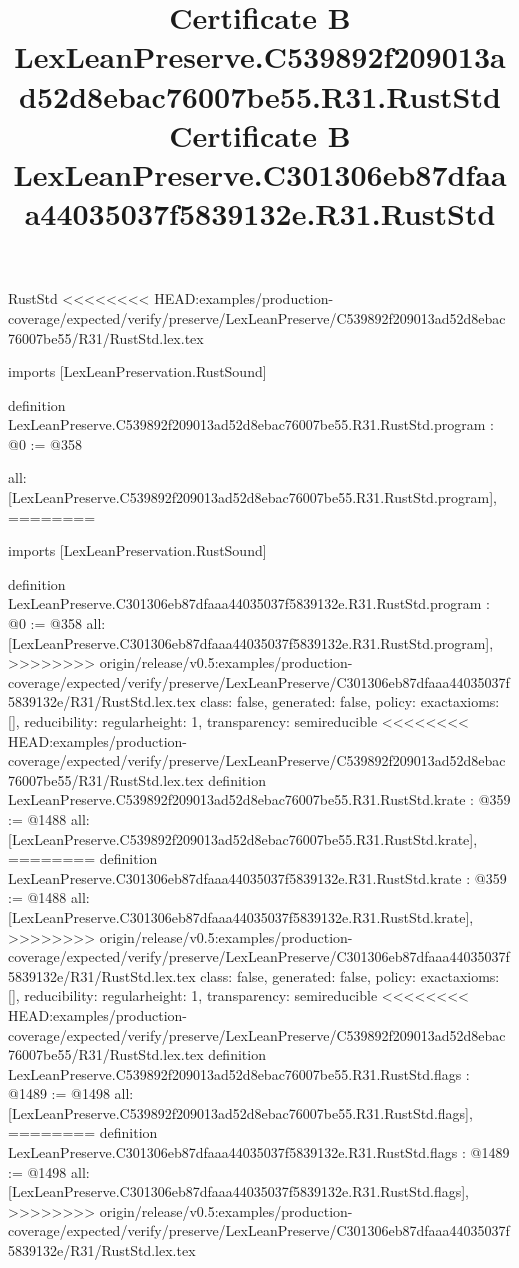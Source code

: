 \begin{lexlean}{RustStd}
<<<<<<<< HEAD:examples/production-coverage/expected/verify/preserve/LexLeanPreserve/C539892f209013ad52d8ebac76007be55/R31/RustStd.lex.tex
\title{Certificate B LexLeanPreserve.C539892f209013ad52d8ebac76007be55.R31.RustStd}
\begin{coremodule}
imports [LexLeanPreservation.RustSound]

definition LexLeanPreserve.C539892f209013ad52d8ebac76007be55.R31.RustStd.program : @0 := @358 {
  all: [LexLeanPreserve.C539892f209013ad52d8ebac76007be55.R31.RustStd.program],
========
\title{Certificate B LexLeanPreserve.C301306eb87dfaaa44035037f5839132e.R31.RustStd}
\begin{coremodule}
imports [LexLeanPreservation.RustSound]

definition LexLeanPreserve.C301306eb87dfaaa44035037f5839132e.R31.RustStd.program : @0 := @358 {
  all: [LexLeanPreserve.C301306eb87dfaaa44035037f5839132e.R31.RustStd.program],
>>>>>>>> origin/release/v0.5:examples/production-coverage/expected/verify/preserve/LexLeanPreserve/C301306eb87dfaaa44035037f5839132e/R31/RustStd.lex.tex
  class: false,
  generated: false,
  policy: exact{axioms: []},
  reducibility: regular{height: 1},
  transparency: semireducible
}
<<<<<<<< HEAD:examples/production-coverage/expected/verify/preserve/LexLeanPreserve/C539892f209013ad52d8ebac76007be55/R31/RustStd.lex.tex
definition LexLeanPreserve.C539892f209013ad52d8ebac76007be55.R31.RustStd.krate : @359 := @1488 {
  all: [LexLeanPreserve.C539892f209013ad52d8ebac76007be55.R31.RustStd.krate],
========
definition LexLeanPreserve.C301306eb87dfaaa44035037f5839132e.R31.RustStd.krate : @359 := @1488 {
  all: [LexLeanPreserve.C301306eb87dfaaa44035037f5839132e.R31.RustStd.krate],
>>>>>>>> origin/release/v0.5:examples/production-coverage/expected/verify/preserve/LexLeanPreserve/C301306eb87dfaaa44035037f5839132e/R31/RustStd.lex.tex
  class: false,
  generated: false,
  policy: exact{axioms: []},
  reducibility: regular{height: 1},
  transparency: semireducible
}
<<<<<<<< HEAD:examples/production-coverage/expected/verify/preserve/LexLeanPreserve/C539892f209013ad52d8ebac76007be55/R31/RustStd.lex.tex
definition LexLeanPreserve.C539892f209013ad52d8ebac76007be55.R31.RustStd.flags : @1489 := @1498 {
  all: [LexLeanPreserve.C539892f209013ad52d8ebac76007be55.R31.RustStd.flags],
========
definition LexLeanPreserve.C301306eb87dfaaa44035037f5839132e.R31.RustStd.flags : @1489 := @1498 {
  all: [LexLeanPreserve.C301306eb87dfaaa44035037f5839132e.R31.RustStd.flags],
>>>>>>>> origin/release/v0.5:examples/production-coverage/expected/verify/preserve/LexLeanPreserve/C301306eb87dfaaa44035037f5839132e/R31/RustStd.lex.tex
}}}
\end{coremodule}}
\end{coremodule}
\end{lexlean}
